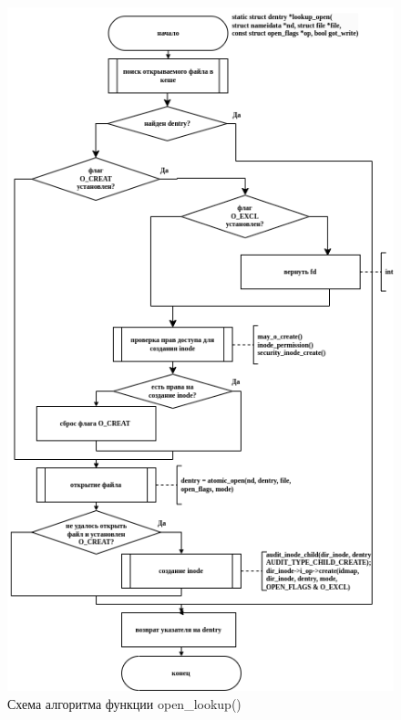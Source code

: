 \begin{figure}[H]
	\centering
	\includegraphics[scale=0.65]{assets/open-lookup_open.drawio.png}
	\caption{Схема алгоритма функции open\_lookup()}
\end{figure}

